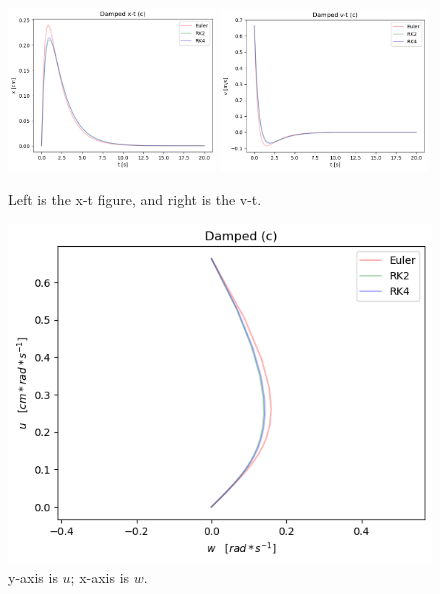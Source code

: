 \documentclass[12pt]{article}
\begin{document}
    \begin{figure}[H]
      \centering 
      \includegraphics[width = 0.49\textwidth]{damped_c_xt.png}
      \includegraphics[width = 0.49\textwidth]{damped_c_vt.png}
      \caption{Left is the x-t figure, and right is the v-t. \label{2.c.norm}}
    \end{figure}

    \begin{figure}[H]
        \centering 
        \includegraphics[width = 12cm]{damped_c.png}
        \caption{y-axis is $u$; x-axis is $w$. \label{2.c.pol}}
    \end{figure}
\end{document}
